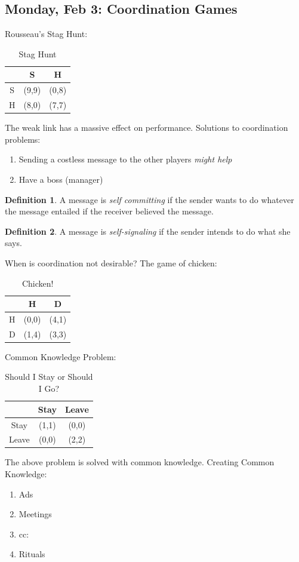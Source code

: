 \documentclass[10pt, oneside]{article}
\theoremstyle{definition}
\newtheorem{defn}{Definition}
\begin{document}
\newpage
\subsection*{Monday, Feb 3: Coordination Games}

Rousseau's Stag Hunt:
    \begin{table}[H]
        \centering
        \begin{tabular}{c|c|c}
             & S & H\\
             \hline
             S& (9,9) & (0,8) \\
             \hline
             H&  (8,0)& (7,7)\\
        \end{tabular}
        \caption{Stag Hunt}
    \end{table}
The weak link has a massive effect on performance. Solutions to coordination problems:
\begin{enumerate}
    \item Sending a costless message to the other players \textit{might help} 
    \item Have a boss (manager)
\end{enumerate}
\begin{defn}
    A message is \textit{self committing} if the sender wants to do whatever the message entailed if the receiver believed the message.
\end{defn}
\begin{defn}
    A message is \textit{self-signaling} if the sender intends to do what she says.
\end{defn}
When is coordination not desirable? The game of chicken:
\begin{table}[H]
        \centering
        \begin{tabular}{c|c|c}
             & H & D\\
             \hline
             H& (0,0) & (4,1) \\
             \hline
             D&  (1,4)& (3,3)\\
        \end{tabular}
        \caption{Chicken!}
    \end{table}
Common Knowledge Problem:\begin{table}[H]
        \centering
        \begin{tabular}{c|c|c}
             & Stay & Leave\\
             \hline
             Stay& (1,1) & (0,0) \\
             \hline
             Leave&  (0,0)& (2,2)\\
        \end{tabular}
        \caption{Should I Stay or Should I Go?}
    \end{table}
The above problem is solved with common knowledge. Creating Common Knowledge:
\begin{enumerate}
    \item Ads
    \item Meetings
    \item cc:
    \item Rituals
\end{enumerate}
\end{document}
